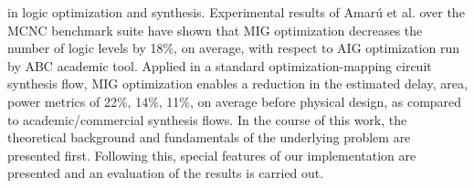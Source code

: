 \documentclass[
	accentcolor=1c,%
	type=intern,
	marginpar=false,
	ruledheaders=section,
	class=report,
	BCOR=5mm,
      parskip=half-,
	fontsize=10pt
	]{tudapub}
\begin{document}
{in logic optimization and synthesis.
\newline
\newline
Experimental results of Amarú et al. over the MCNC benchmark suite have shown that MIG optimization decreases the
number of logic levels by 18\%, on average, with respect to AIG optimization run by ABC academic
tool. Applied in a standard optimization-mapping circuit synthesis flow, MIG optimization enables
a reduction in the estimated {delay, area, power} metrics of {22\%, 14\%, 11\%},  on average before physical
design, as compared to academic/commercial synthesis flows.
\newline
\newline
In the course of this work, the theoretical background and fundamentals of the underlying problem are presented first.
Following this, special features of our implementation are presented and an evaluation of the results is carried out.
}

\newpage
\end{document}
